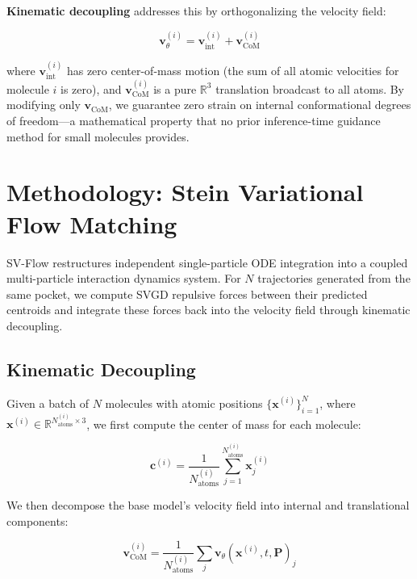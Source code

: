 \documentclass[a4paper,11pt]{article}
\begin{document}
\textbf{Kinematic decoupling} addresses this by orthogonalizing the velocity
field:

\begin{equation}
\mathbf{v}_\theta^{(i)} = \mathbf{v}_{\text{int}}^{(i)} + \mathbf{v}_{\text{CoM}}^{(i)}
\label{eq:decoupling}
\end{equation}

where $\mathbf{v}_{\text{int}}^{(i)}$ has zero center-of-mass motion (the sum of
all atomic velocities for molecule $i$ is zero), and $\mathbf{v}_{\text{CoM}}^{(i)}$
is a pure $\mathbb{R}^3$ translation broadcast to all atoms.  By modifying only
$\mathbf{v}_{\text{CoM}}$, we guarantee zero strain on internal conformational
degrees of freedom---a mathematical property that no prior inference-time
guidance method for small molecules provides.

\section{Methodology: Stein Variational Flow Matching}

SV-Flow restructures independent single-particle ODE integration into a coupled
multi-particle interaction dynamics system.  For $N$ trajectories generated from
the same pocket, we compute SVGD repulsive forces between their predicted
centroids and integrate these forces back into the velocity field through
kinematic decoupling.

\subsection{Kinematic Decoupling}

Given a batch of $N$ molecules with atomic positions
$\{\mathbf{x}^{(i)}\}_{i=1}^N$, where $\mathbf{x}^{(i)} \in
\mathbb{R}^{N_{\text{atoms}}^{(i)} \times 3}$, we first compute the center of
mass for each molecule:

\begin{equation}
\mathbf{c}^{(i)} = \frac{1}{N_{\text{atoms}}^{(i)}} \sum_{j=1}^{N_{\text{atoms}}^{(i)}} \mathbf{x}_j^{(i)}
\label{eq:com}
\end{equation}

We then decompose the base model's velocity field into internal and translational
components:

\begin{equation}
\mathbf{v}_{\text{CoM}}^{(i)} = \frac{1}{N_{\text{atoms}}^{(i)}} \sum_{j} \mathbf{v}_\theta(\mathbf{x}^{(i)}, t, \mathbf{P})_j
\label{eq:vcom}
\end{equation}
\end{document}
